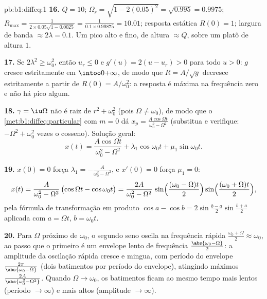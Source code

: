 \begin{solution}{pb:b1:diffeq:1}
\textbf{16.} $Q = 10$; $\Omega_r = \sqrt{1 - 2(0.05)^2} =
\sqrt{0.995} = 0.9975$; $R_{\max} = \frac1{2 \times 0.05
\sqrt{1 - 0.0025}} = \frac1{0.1 \times 0.99875} = 10.01$; resposta
estática $R(0) = 1$; largura de banda $\approx 2\lambda = 0.1$. Um pico
alto e fino, de altura $\approx Q$, sobre um platô de altura $1$.

\textbf{17.} Se $2\lambda^2 \geq \omega_0^2$, então $u_r \leq 0$ e
$g'(u) = 2(u - u_r) > 0$ para todo $u > 0$: $g$ cresce estritamente
em $\intoo0{+\infty}$, de modo que $R = A/\sqrt g$ decresce estritamente a
partir de $R(0) = A/\omega_0^2$: a resposta é máxima na frequência zero
e não há pico algum.

\textbf{18.} $\gamma = \iu\Omega$ não é raiz de $r^2 +
\omega_0^2$ (pois $\Omega \neq \omega_0$), de modo que o
\cref{met:b1:diffeq:particular} com $m = 0$ dá $x_p =
\frac{A\cos\Omega t}{\omega_0^2 - \Omega^2}$ (substitua e
verifique: $-\Omega^2 + \omega_0^2$ vezes o cosseno). Solução
geral:
\[
x(t) = \frac{A\cos\Omega t}{\omega_0^2 - \Omega^2}
+ \lambda_1\cos\omega_0 t + \mu_1\sin\omega_0 t .
\]

\textbf{19.} $x(0) = 0$ força $\lambda_1 = -\frac A{\omega_0^2 -
\Omega^2}$, e $x'(0) = 0$ força $\mu_1 = 0$:
\[
x(t) = \frac{A}{\omega_0^2 - \Omega^2}\,
\bigl(\cos\Omega t - \cos\omega_0 t\bigr)
= \frac{2A}{\omega_0^2 - \Omega^2}\,
\sin\Bigl(\frac{(\omega_0 - \Omega)t}2\Bigr)
\sin\Bigl(\frac{(\omega_0 + \Omega)t}2\Bigr) ,
\]
pela fórmula de transformação em produto $\cos a - \cos b =
2\sin\frac{b - a}2\sin\frac{b + a}2$ aplicada com $a = \Omega t$,
$b = \omega_0 t$.

\textbf{20.} Para $\Omega$ próximo de $\omega_0$, o segundo seno
oscila na frequência rápida $\frac{\omega_0 + \Omega}2
\approx \omega_0$, ao passo que o primeiro é um envelope lento de frequência
$\frac{\abs{\omega_0 - \Omega}}2$: a amplitude da oscilação rápida
cresce e mingua, com período do envelope
$\frac{2\pi}{\abs{\omega_0 - \Omega}}$ (dois batimentos por período do
envelope), atingindo máximos $\frac{2A}{\abs{\omega_0^2 - \Omega^2}}$.
Quando $\Omega \to \omega_0$, os batimentos ficam ao mesmo tempo mais lentos
(período $\to \infty$) e mais altos (amplitude $\to \infty$).


\end{solution}
